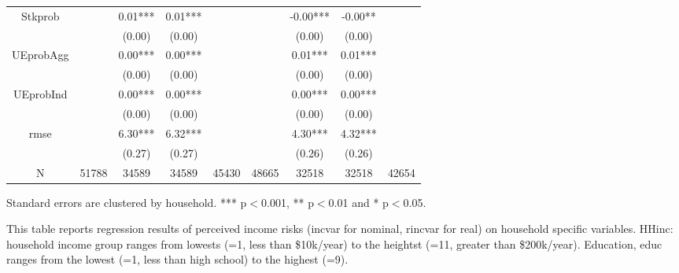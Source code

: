 \begin{table}[p]
\begin{adjustbox}{width=\textwidth}
\begin{threeparttable}
\begin{tabular}{ccccccccc}
Stkprob          &           &   0.01*** &    0.01*** &             &           &   -0.00*** &     -0.00** &              \\
                 &           &    (0.00) &     (0.00) &             &           &     (0.00) &      (0.00) &              \\
UEprobAgg        &           &   0.00*** &    0.00*** &             &           &    0.01*** &     0.01*** &              \\
                 &           &    (0.00) &     (0.00) &             &           &     (0.00) &      (0.00) &              \\
UEprobInd        &           &   0.00*** &    0.00*** &             &           &    0.00*** &     0.00*** &              \\
                 &           &    (0.00) &     (0.00) &             &           &     (0.00) &      (0.00) &              \\
rmse             &           &   6.30*** &    6.32*** &             &           &    4.30*** &     4.32*** &              \\
                 &           &    (0.27) &     (0.27) &             &           &     (0.26) &      (0.26) &              \\
N                &     51788 &     34589 &      34589 &       45430 &     48665 &      32518 &       32518 &        42654 \\
\bottomrule
\end{tabular}
\begin{tablenotes}\item Standard errors are clustered by household. *** p$<$0.001, ** p$<$0.01 and * p$<$0.05. 
\item This table reports regression results of perceived income risks (incvar for nominal, rincvar for real) on household specific variables. HHinc: household income group ranges from lowests (=1, less than \$10k/year) to the heightst (=11, greater than \$200k/year). Education, educ ranges from the lowest (=1, less than high school) to the highest (=9).
\end{tablenotes}
\end{threeparttable}
\end{adjustbox}
\end{table}

